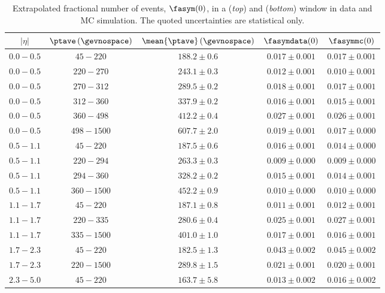 \begin{table}[!htb]
  \caption{
    Extrapolated fractional number of events, $\fasym(0)$, in a  (\textit{top}) and  (\textit{bottom}) window in data and MC simulation.
    The quoted uncertainties are statistical only.}
  \label{tab:App:ResTails:ExtraNumEvtsIncl}
  \begin{center}
    \begin{tabular}[ht]{ccccc}
      \toprule
      $|\eta|$ & $\ptave \,(\gevnospace)$ & $\mean{\ptave} \,(\gevnospace)$ & $\fasymdata(0)$ & $\fasymmc(0)$ \\ 
      \midrule
      $0.0 - 0.5$ & $45 - 220$ & $188.2 \pm 0.6$ & $0.017 \pm 0.001$ & $0.017 \pm 0.001$ \\ 
      $0.0 - 0.5$ & $220 - 270$ & $243.1 \pm 0.3$ & $0.012 \pm 0.001$ & $0.010 \pm 0.001$ \\ 
      $0.0 - 0.5$ & $270 - 312$ & $289.5 \pm 0.2$ & $0.018 \pm 0.001$ & $0.017 \pm 0.001$ \\ 
      $0.0 - 0.5$ & $312 - 360$ & $337.9 \pm 0.2$ & $0.016 \pm 0.001$ & $0.015 \pm 0.001$ \\ 
      $0.0 - 0.5$ & $360 - 498$ & $412.2 \pm 0.4$ & $0.027 \pm 0.001$ & $0.026 \pm 0.001$ \\ 
      $0.0 - 0.5$ & $498 - 1500$ & $607.7 \pm 2.0$ & $0.019 \pm 0.001$ & $0.017 \pm 0.000$ \\ 
      \midrule
      $0.5 - 1.1$ & $45 - 220$ & $187.5 \pm 0.6$ & $0.016 \pm 0.001$ & $0.014 \pm 0.000$ \\ 
      $0.5 - 1.1$ & $220 - 294$ & $263.3 \pm 0.3$ & $0.009 \pm 0.000$ & $0.009 \pm 0.000$ \\ 
      $0.5 - 1.1$ & $294 - 360$ & $328.2 \pm 0.2$ & $0.015 \pm 0.001$ & $0.014 \pm 0.001$ \\ 
      $0.5 - 1.1$ & $360 - 1500$ & $452.2 \pm 0.9$ & $0.010 \pm 0.000$ & $0.010 \pm 0.000$ \\ 
      \midrule
      $1.1 - 1.7$ & $45 - 220$ & $187.1 \pm 0.8$ & $0.011 \pm 0.001$ & $0.012 \pm 0.001$ \\ 
      $1.1 - 1.7$ & $220 - 335$ & $280.6 \pm 0.4$ & $0.025 \pm 0.001$ & $0.027 \pm 0.001$ \\ 
      $1.1 - 1.7$ & $335 - 1500$ & $401.0 \pm 1.0$ & $0.017 \pm 0.001$ & $0.016 \pm 0.001$ \\ 
      \midrule
      $1.7 - 2.3$ & $45 - 220$ & $182.5 \pm 1.3$ & $0.043 \pm 0.002$ & $0.045 \pm 0.002$ \\ 
      $1.7 - 2.3$ & $220 - 1500$ & $289.8 \pm 1.5$ & $0.021 \pm 0.001$ & $0.020 \pm 0.001$ \\ 
      \midrule
      $2.3 - 5.0$ & $45 - 220$ & $163.7 \pm 5.8$ & $0.013 \pm 0.002$ & $0.016 \pm 0.002$ \\ 
      \bottomrule
  \end{tabular}
  \end{center}
  

\end{table}

